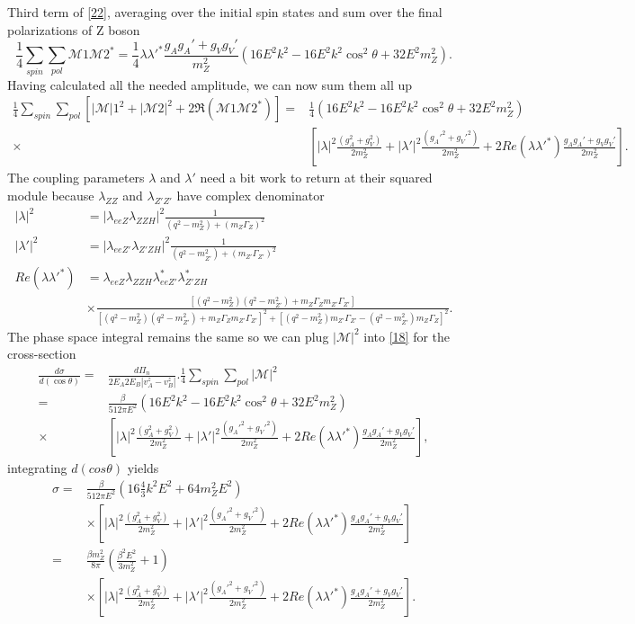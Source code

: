 \documentclass{report}
\newcommand{\nn}{\nonumber}
\numberwithin{equation}{section}
\begin{document}
Third term of \eqref{22},
averaging over the initial spin states and sum over the final polarizations of Z boson
\begin{equation}
\frac{1}{4}\sum_{spin} \sum_{pol}\mathcal{M}1 \mathcal{M}2^*=\frac{1}{4}\lambda \lambda'^*\frac{g_Ag_A'+g_Vg_V'}{m_Z^2}(16E^2k^2- 16E^2k^2\cos^2 \theta  +
   32 E^2m_{Z}^2).
\end{equation}
Having calculated all the needed amplitude, we can now sum them all up
\begin{align}
\frac{1}{4}\sum_{spin} \sum_{pol}\left[|\mathcal{M}|1^2+|\mathcal{M}2|^2+2\Re( \mathcal{M}1 \mathcal{M}2^*)\right]=&\frac{1}{4} (16E^2k^2- 16E^2k^2\cos^2 \theta  +32 E^2m_{Z}^2)\nn\\
\times &\left[|\lambda|^2\frac{(g_A^2 + g_V^2)}{2m_{Z}^2}+|\lambda'|^2 \frac{(g_A'^2 + g_V'^2)}{2m_{Z}^2}+2Re(\lambda \lambda'^*)\frac{g_Ag_A'+g_Vg_V'}{2m_Z^2}\right].
\end{align}
The coupling parameters $\lambda$ and $\lambda'$ need a bit work to return at their squared module because $\lambda_{ZZ}$ and $\lambda_{Z'Z'}$ have complex denominator
\begin{align}
|\lambda|^2&=|\lambda_{eeZ}\lambda_{ZZH}|^2 \frac{1}{(q^2-m_Z^2)+(m_Z\Gamma_Z)^2}\\
|\lambda'|^2&=|\lambda_{eeZ'}\lambda_{Z'ZH}|^2 \frac{1}{(q^2-m_{Z'}^2)+(m_{Z'}\Gamma_{Z'})^2}\\
Re(\lambda\lambda'^*)&=\lambda_{eeZ} \lambda_{ZZH}\lambda_{eeZ'}^* \lambda_{Z'ZH}^* \nn\\
&\times \frac{\left[(q^2-m_Z^2)(q^2-m_{Z'}^2)+m_Z\Gamma_Zm_{Z'}\Gamma_{Z'}\right] }{\left[(q^2-m_Z^2)(q^2-m_{Z'}^2)+m_Z\Gamma_Zm_{Z'}\Gamma_{Z'}\right]^2+\left[(q^2-m_Z^2)m_{Z'}\Gamma_{Z'}-(q^2-m_{Z'}^2)m_Z\Gamma_Z\right]^2}.
\end{align}
The phase space integral remains the same so we can plug $|\mathcal{M}|^2$ into \eqref{18} for the cross-section
\begin{align}
\frac{d\sigma}{d(\cos\theta)}=&\frac{d\Pi_n}{2E_A2E_B|v_A^z-v_B^z|}.\frac{1}{4}\sum_{spin} \sum_{pol} |\mathcal{M}|^2\\
=&\frac{\beta}{512\pi E^2}(16E^2k^2- 16E^2k^2\cos^2 \theta  +32 E^2m_{Z}^2)\nn\\
\times& \left[|\lambda|^2\frac{(g_A^2 + g_V^2)}{2m_{Z}^2}+|\lambda'|^2 \frac{(g_A'^2 + g_V'^2)}{2m_{Z}^2}+2Re(\lambda \lambda'^*)\frac{g_Ag_A'+g_Vg_V'}{2m_Z^2}\right],
\end{align}
integrating $d(cos\theta)$ yields
\begin{align}
\sigma=&\frac{\beta}{512\pi E^2}\left(16  \frac{4}{3} k^2E^2+64m_Z^2 E^2\right)\nn\\
&\times \left[|\lambda|^2\frac{(g_A^2 + g_V^2)}{2m_{Z}^2}+|\lambda'|^2 \frac{(g_A'^2 + g_V'^2)}{2m_{Z}^2}+2Re(\lambda \lambda'^*)\frac{g_Ag_A'+g_Vg_V'}{2m_Z^2}\right]\\
=&\frac{\beta m_Z^2}{8\pi}\left(\frac{\beta^2 E^2}{3 m_Z^2}+ 1\right)\nn\\
&\times \left[|\lambda|^2\frac{(g_A^2 + g_V^2)}{2m_{Z}^2}+|\lambda'|^2 \frac{(g_A'^2 + g_V'^2)}{2m_{Z}^2}+2Re(\lambda \lambda'^*)\frac{g_Ag_A'+g_Vg_V'}{2m_Z^2}\right].
\end{align}
\end{document}
